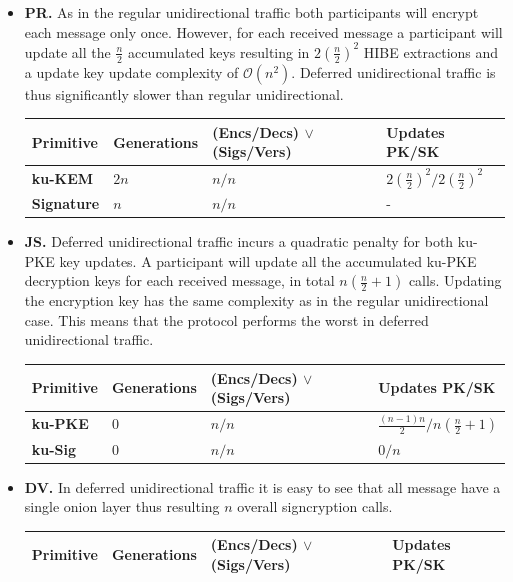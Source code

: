 \documentclass[11pt,a4paper,twoside,openright,bibliography=totoc]{scrbook}
\begin{document}
\begin{itemize}
\item \textbf{PR.} As in the regular unidirectional traffic both
  participants will encrypt each message only once. However, for
  each received message a participant will update all
  the $\frac{n}{2}$ accumulated keys resulting in $2(\frac{n}{2})^2$
  HIBE extractions and a update key update complexity of $\mathcal{O}(n^2)$.
  Deferred unidirectional traffic is thus significantly slower than
  regular unidirectional.
  \begin{center}
    \begin{tabular}{ | l | l | l | l |}
    \hline
    Primitive & Generations & (Encs/Decs) $\vee$ (Sigs/Vers) & Updates PK/SK \\ \hline
    \textbf{ku-KEM} & $2n$ & $n/n$ & $2(\frac{n}{2})^2/2(\frac{n}{2})^2$ \\ \hline
    \textbf{Signature} & $n$ & $n/n$ & - \\  
    \hline
    \end{tabular}
  \end{center}
\item \textbf{JS.} Deferred unidirectional traffic incurs a quadratic
  penalty for both ku-PKE key updates. A participant
  will update all the accumulated ku-PKE decryption keys for
  each received message, in total $n(\frac{n}{2}+1)$ calls.
  Updating the encryption key has the same complexity as in the
  regular unidirectional case. This means that the protocol
  performs the worst in deferred unidirectional traffic.
  \begin{center}
    \begin{tabular}{ | l | l | l | l |}
    \hline
    Primitive & Generations & (Encs/Decs) $\vee$ (Sigs/Vers) & Updates PK/SK \\ \hline
    \textbf{ku-PKE} & $0$ & $n/n$ & $\frac{(n-1)n}{2}/n(\frac{n}{2}+1)$ \\ \hline
    \textbf{ku-Sig} & $0$ & $n/n$ & $0/n$ \\  
    \hline
    \end{tabular}
  \end{center}
\item \textbf{DV.} In deferred unidirectional traffic it is easy to see that
  all message have a single onion layer thus resulting $n$ overall
  signcryption calls.
  \begin{center}
    \begin{tabular}{ | l | l | l | l |}
    \hline
    Primitive & Generations & (Encs/Decs) $\vee$ (Sigs/Vers) & Updates PK/SK \\ \hline

\end{tabular}
\end{center}
\end{itemize}
\end{document}
